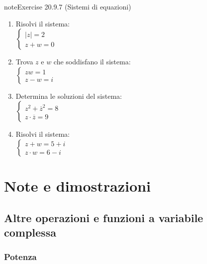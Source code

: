\documentclass[letterpaper,10pt,italian]{jupyterBook}
\begin{document}
\begin{sphinxadmonition}{note}{Exercise 20.9.7 (Sistemi di equazioni)}
\begin{enumerate}
\item {} 
\sphinxAtStartPar
Risolvi il sistema:\\
\(\begin{cases} 
|z| = 2 \\
z + w = 0 
\end{cases}\)

\item {} 
\sphinxAtStartPar
Trova \(z\) e \(w\) che soddisfano il sistema:\\
\(\begin{cases} 
z w = 1 \\
z - w = i 
\end{cases}\)

\item {} 
\sphinxAtStartPar
Determina le soluzioni del sistema:\\
\(\begin{cases} 
z^2 + \overline{z}^2 = 8 \\
z \cdot \overline{z} = 9 
\end{cases}\)

\item {} 
\sphinxAtStartPar
Risolvi il sistema:\\
\(\begin{cases} 
z + w = 5 + i \\
z \cdot w = 6 - i 
\end{cases}\)

\end{enumerate}
\end{sphinxadmonition}

\sphinxstepscope


\section{Note e dimostrazioni}
\label{\detokenize{ch/algebra/complex-algebra-notes:note-e-dimostrazioni}}\label{\detokenize{ch/algebra/complex-algebra-notes:math-hs-algebra-complex-notes}}\label{\detokenize{ch/algebra/complex-algebra-notes::doc}}

\subsection{Altre operazioni e funzioni a variabile complessa}
\label{\detokenize{ch/algebra/complex-algebra-notes:altre-operazioni-e-funzioni-a-variabile-complessa}}\label{\detokenize{ch/algebra/complex-algebra-notes:math-hs-algebra-complex-notes-fun}}

\subsubsection{Potenza}
\label{\detokenize{ch/algebra/complex-algebra-notes:potenza}}\label{\detokenize{ch/algebra/complex-algebra-notes:math-hs-algebra-complex-notes-fun-power}}
\end{document}
